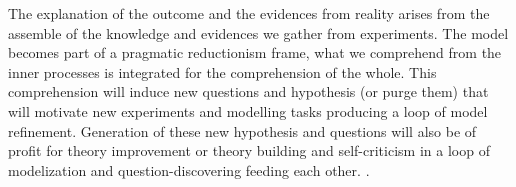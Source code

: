 \documentclass[11pt,oneside,a4paper,openright]{report}
\begin{document}
%
%
%
The explanation of the outcome and the evidences from reality arises from the assemble of the knowledge and evidences we gather from experiments. The model becomes part of a pragmatic reductionism frame, what we comprehend from the inner processes is integrated for the comprehension of the whole. This comprehension will induce new questions and hypothesis (or purge them) that will motivate new experiments and modelling tasks producing a loop of model refinement. Generation of these new hypothesis and questions will also be of profit for theory improvement or theory building and self-criticism in a loop of modelization and question-discovering feeding each other. .\\ 

\end{document}
